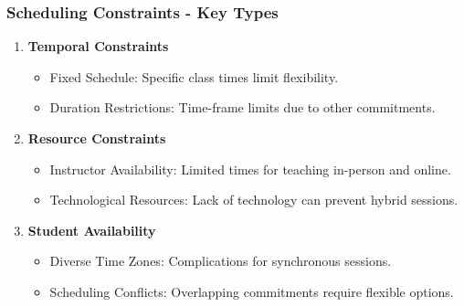 \documentclass[aspectratio=169]{beamer}
\begin{document}
\begin{frame}[fragile]
    \frametitle{Scheduling Constraints - Key Types}
    \begin{enumerate}
        \item \textbf{Temporal Constraints}
            \begin{itemize}
                \item Fixed Schedule: Specific class times limit flexibility.
                \item Duration Restrictions: Time-frame limits due to other commitments.
            \end{itemize}
        \item \textbf{Resource Constraints}
            \begin{itemize}
                \item Instructor Availability: Limited times for teaching in-person and online.
                \item Technological Resources: Lack of technology can prevent hybrid sessions.
            \end{itemize}
        \item \textbf{Student Availability}
            \begin{itemize}
                \item Diverse Time Zones: Complications for synchronous sessions.
                \item Scheduling Conflicts: Overlapping commitments require flexible options.
            \end{itemize}
    \end{enumerate}
\end{frame}
\end{document}

